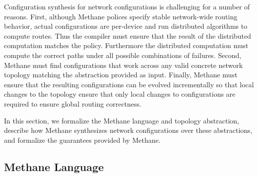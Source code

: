 \documentclass{sig-alternate-10pt}
\newcommand{\sysname}{{\small \sf Methane}\xspace}
\begin{document}
Configuration synthesis for network configurations is challenging for a number of reasons. First, although \sysname polices specify stable network-wide routing behavior, actual configurations are per-device and run distributed algorithms to compute routes. Thus the compiler must ensure that the result of the distributed computation matches the policy. Furthermore the distributed computation must compute the correct paths under all possible combinations of failures. Second, \sysname must find configurations that work across any valid concrete network topology matching the abstraction provided as input. Finally, \sysname must ensure that the resulting configurations can be evolved incrementally so that local changes to the topology ensure that only local changes to configurations are required to ensure global routing correctness.

In this section, we formalize the \sysname language and topology abstraction, describe how \sysname synthesizes network configurations over these abstractions, and formalize the guarantees provided by \sysname.

\subsection{Methane Language}
\end{document}
